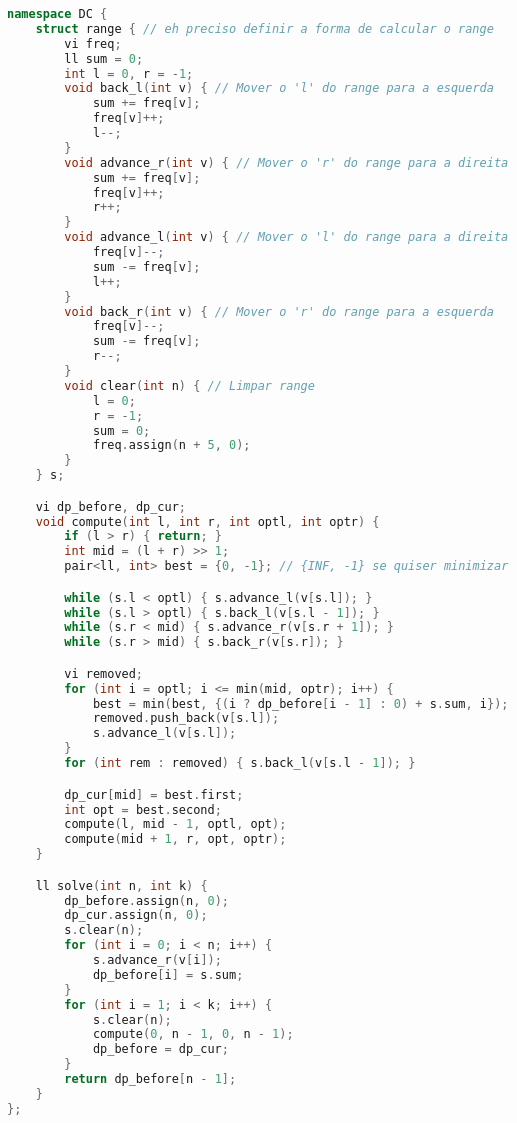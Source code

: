 \documentclass[11pt, a4paper, twoside]{book}
\begin{document}
\hfill

\begin{lstlisting}[language=C++]
namespace DC {
    struct range { // eh preciso definir a forma de calcular o range
        vi freq;
        ll sum = 0;
        int l = 0, r = -1;
        void back_l(int v) { // Mover o 'l' do range para a esquerda
            sum += freq[v];
            freq[v]++;
            l--;
        }
        void advance_r(int v) { // Mover o 'r' do range para a direita
            sum += freq[v];
            freq[v]++;
            r++;
        }
        void advance_l(int v) { // Mover o 'l' do range para a direita
            freq[v]--;
            sum -= freq[v];
            l++;
        }
        void back_r(int v) { // Mover o 'r' do range para a esquerda
            freq[v]--;
            sum -= freq[v];
            r--;
        }
        void clear(int n) { // Limpar range
            l = 0;
            r = -1;
            sum = 0;
            freq.assign(n + 5, 0);
        }
    } s;

    vi dp_before, dp_cur;
    void compute(int l, int r, int optl, int optr) {
        if (l > r) { return; }
        int mid = (l + r) >> 1;
        pair<ll, int> best = {0, -1}; // {INF, -1} se quiser minimizar

        while (s.l < optl) { s.advance_l(v[s.l]); }
        while (s.l > optl) { s.back_l(v[s.l - 1]); }
        while (s.r < mid) { s.advance_r(v[s.r + 1]); }
        while (s.r > mid) { s.back_r(v[s.r]); }

        vi removed;
        for (int i = optl; i <= min(mid, optr); i++) {
            best = min(best, {(i ? dp_before[i - 1] : 0) + s.sum, i}); // min() se quiser minimizar
            removed.push_back(v[s.l]);
            s.advance_l(v[s.l]);
        }
        for (int rem : removed) { s.back_l(v[s.l - 1]); }

        dp_cur[mid] = best.first;
        int opt = best.second;
        compute(l, mid - 1, optl, opt);
        compute(mid + 1, r, opt, optr);
    }

    ll solve(int n, int k) {
        dp_before.assign(n, 0);
        dp_cur.assign(n, 0);
        s.clear(n);
        for (int i = 0; i < n; i++) {
            s.advance_r(v[i]);
            dp_before[i] = s.sum;
        }
        for (int i = 1; i < k; i++) {
            s.clear(n);
            compute(0, n - 1, 0, n - 1);
            dp_before = dp_cur;
        }
        return dp_before[n - 1];
    }
};
\end{lstlisting}
\end{document}

